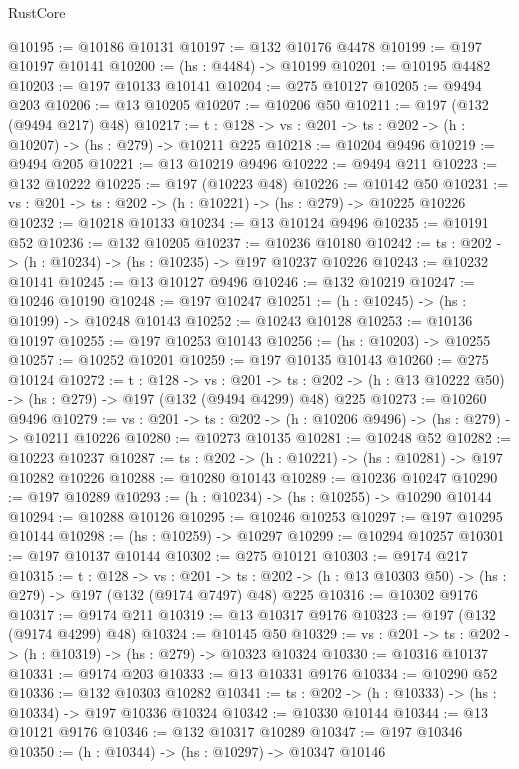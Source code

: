 \begin{lexlean}{RustCore}
\begin{coremodule}
@10195 := @10186 @10131
@10197 := @132 @10176 @4478
@10199 := @197 @10197 @10141
@10200 := (hs : @4484) -> @10199
@10201 := @10195 @4482
@10203 := @197 @10133 @10141
@10204 := @275 @10127
@10205 := @9494 @203
@10206 := @13 @10205
@10207 := @10206 @50
@10211 := @197 (@132 (@9494 @217) @48)
@10217 := {t : @128} -> {vs : @201} -> {ts : @202} -> (h : @10207) -> (hs : @279) -> @10211 @225
@10218 := @10204 @9496
@10219 := @9494 @205
@10221 := @13 @10219 @9496
@10222 := @9494 @211
@10223 := @132 @10222
@10225 := @197 (@10223 @48)
@10226 := @10142 @50
@10231 := {vs : @201} -> {ts : @202} -> (h : @10221) -> (hs : @279) -> @10225 @10226
@10232 := @10218 @10133
@10234 := @13 @10124 @9496
@10235 := @10191 @52
@10236 := @132 @10205
@10237 := @10236 @10180
@10242 := {ts : @202} -> (h : @10234) -> (hs : @10235) -> @197 @10237 @10226
@10243 := @10232 @10141
@10245 := @13 @10127 @9496
@10246 := @132 @10219
@10247 := @10246 @10190
@10248 := @197 @10247
@10251 := (h : @10245) -> (hs : @10199) -> @10248 @10143
@10252 := @10243 @10128
@10253 := @10136 @10197
@10255 := @197 @10253 @10143
@10256 := (hs : @10203) -> @10255
@10257 := @10252 @10201
@10259 := @197 @10135 @10143
@10260 := @275 @10124
@10272 := {t : @128} ->
  {vs : @201} ->
  {ts : @202} -> (h : @13 @10222 @50) -> (hs : @279) -> @197 (@132 (@9494 @4299) @48) @225
@10273 := @10260 @9496
@10279 := {vs : @201} -> {ts : @202} -> (h : @10206 @9496) -> (hs : @279) -> @10211 @10226
@10280 := @10273 @10135
@10281 := @10248 @52
@10282 := @10223 @10237
@10287 := {ts : @202} -> (h : @10221) -> (hs : @10281) -> @197 @10282 @10226
@10288 := @10280 @10143
@10289 := @10236 @10247
@10290 := @197 @10289
@10293 := (h : @10234) -> (hs : @10255) -> @10290 @10144
@10294 := @10288 @10126
@10295 := @10246 @10253
@10297 := @197 @10295 @10144
@10298 := (hs : @10259) -> @10297
@10299 := @10294 @10257
@10301 := @197 @10137 @10144
@10302 := @275 @10121
@10303 := @9174 @217
@10315 := {t : @128} ->
  {vs : @201} ->
  {ts : @202} -> (h : @13 @10303 @50) -> (hs : @279) -> @197 (@132 (@9174 @7497) @48) @225
@10316 := @10302 @9176
@10317 := @9174 @211
@10319 := @13 @10317 @9176
@10323 := @197 (@132 (@9174 @4299) @48)
@10324 := @10145 @50
@10329 := {vs : @201} -> {ts : @202} -> (h : @10319) -> (hs : @279) -> @10323 @10324
@10330 := @10316 @10137
@10331 := @9174 @203
@10333 := @13 @10331 @9176
@10334 := @10290 @52
@10336 := @132 @10303 @10282
@10341 := {ts : @202} -> (h : @10333) -> (hs : @10334) -> @197 @10336 @10324
@10342 := @10330 @10144
@10344 := @13 @10121 @9176
@10346 := @132 @10317 @10289
@10347 := @197 @10346
@10350 := (h : @10344) -> (hs : @10297) -> @10347 @10146

\end{coremodule}
\end{lexlean}
